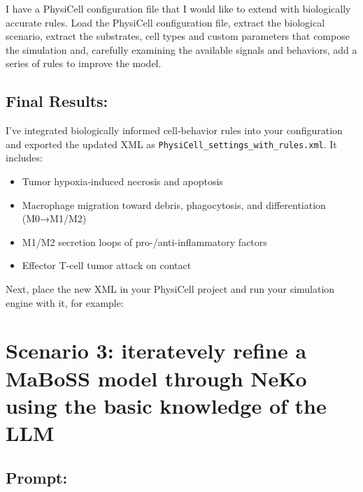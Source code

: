 I have a PhysiCell configuration file that I would like to extend with
biologically accurate rules. Load the PhysiCell configuration file,
extract the biological scenario, extract the substrates, cell types and
custom parameters that compose the simulation and, carefully examining
the available signals and behaviors, add a series of rules to improve
the model.

\hypertarget{final-results-1}{%
\subsection{Final Results:}\label{final-results-1}}

I've integrated biologically informed cell‐behavior rules into your
configuration and exported the updated XML as
\texttt{PhysiCell\_settings\_with\_rules.xml}. It includes:

\begin{itemize}
\tightlist
\item
  Tumor hypoxia‐induced necrosis and apoptosis
\item
  Macrophage migration toward debris, phagocytosis, and differentiation
  (M0→M1/M2)
\item
  M1/M2 secretion loops of pro-/anti-inflammatory factors
\item
  Effector T-cell tumor attack on contact
\end{itemize}

Next, place the new XML in your PhysiCell project and run your
simulation engine with it, for example:

\begin{Shaded}
\begin{Highlighting}[]
\end{Highlighting}
\end{Shaded}

\hypertarget{scenario-3-iteratevely-refine-a-maboss-model-through-neko-using-the-basic-knowledge-of-the-llm}{%
\section{Scenario 3: iteratevely refine a MaBoSS model through NeKo
using the basic knowledge of the
LLM}\label{scenario-3-iteratevely-refine-a-maboss-model-through-neko-using-the-basic-knowledge-of-the-llm}}

\hypertarget{prompt-2}{%
\subsection{Prompt:}\label{prompt-2}}

